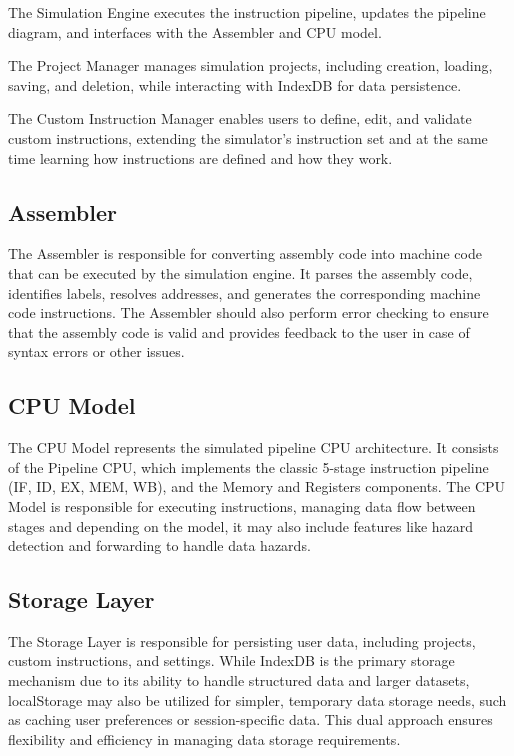 The Simulation Engine executes the instruction pipeline, updates the pipeline diagram, and interfaces with the Assembler and CPU model.

The Project Manager manages simulation projects, including creation, loading, saving, and deletion, while interacting with IndexDB for data persistence.

The Custom Instruction Manager enables users to define, edit, and validate custom instructions, extending the simulator's instruction set and at the same time learning how instructions are defined and how they work.

\subsection{Assembler}
The Assembler is responsible for converting assembly code into machine code that can be executed by the simulation engine. It parses the assembly code, identifies labels, resolves addresses, and generates the corresponding machine code instructions. The Assembler should also perform error checking to ensure that the assembly code is valid and provides feedback to the user in case of syntax errors or other issues.

\subsection{CPU Model}
The CPU Model represents the simulated pipeline CPU architecture. It consists of the Pipeline CPU, which implements the classic 5-stage instruction pipeline (IF, ID, EX, MEM, WB), and the Memory and Registers components. The CPU Model is responsible for executing instructions, managing data flow between stages and depending on the model, it may also include features like hazard detection and forwarding to handle data hazards.

\subsection{Storage Layer}
The Storage Layer is responsible for persisting user data, including projects, custom instructions, and settings. While IndexDB is the primary storage mechanism due to its ability to handle structured data and larger datasets, localStorage may also be utilized for simpler, temporary data storage needs, such as caching user preferences or session-specific data. This dual approach ensures flexibility and efficiency in managing data storage requirements.





